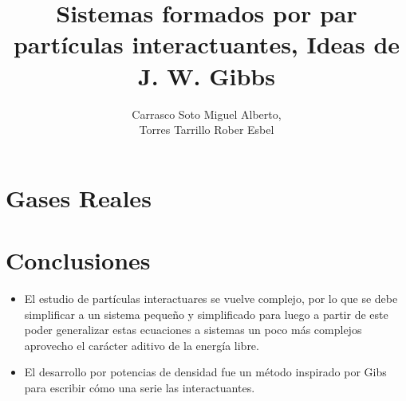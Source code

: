 \documentclass[12pt, a4paper]{article}
\title{Sistemas formados por par partículas interactuantes, Ideas de J. W. Gibbs}
\author{Carrasco Soto Miguel Alberto, \\Torres Tarrillo Rober Esbel}
\begin{document}
\maketitle
\tableofcontents

\newpage


\section{Gases Reales}



\section{Conclusiones}

\begin{itemize}
\item El estudio de partículas interactuares se vuelve complejo, por lo que
se debe simplificar a un sistema pequeño y simplificado para luego a partir
de este poder generalizar estas ecuaciones a sistemas un poco más complejos
aprovecho el carácter aditivo de la energía libre.

\item El desarrollo por potencias de densidad fue un método inspirado por
Gibs para escribir cómo una serie las interactuantes.
\end{itemize}


\printbibliography 
\end{document}
